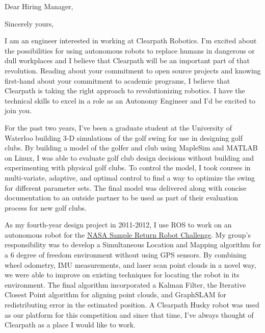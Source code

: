 \documentclass[11pt,a4paper,sans]{moderncv} %
\begin{document}
\clearpage

\date{\today} %
\opening{Dear Hiring Manager,} %
\closing{Sincerely yours,} %

\makelettertitle %

I am an engineer interested in working at Clearpath Robotics. I'm excited about the possibilities for using autonomous robots to replace humans in dangerous or dull workplaces and I believe that Clearpath will be an important part of that revolution. Reading about your commitment to open source projects and knowing first-hand about your commitment to academic programs, I believe that Clearpath is taking the right approach to revolutionizing robotics. I have the technical skills to excel in a role as an Autonomy Engineer and I'd be excited to join you.

For the past two years, I've been a graduate student at the University of Waterloo building 3-D simulations of the golf swing for use in designing golf clubs. By building a model of the golfer and club using MapleSim and MATLAB on Linux, I was able to evaluate golf club design decisions without building and experimenting with physical golf clubs. To control the model, I took courses in multi-variate, adaptive, and optimal control to find a way to optimize the swing for different parameter sets. The final model was delivered along with concise documentation to an outside partner to be used as part of their evaluation process for new golf clubs.

As my fourth-year design project in 2011-2012, I use ROS to work on an autonomous robot for the \href{http://www.nasa.gov/directorates/spacetech/centennial_challenges/sample_return_robot/index.html}{NASA Sample Return Robot Challenge}. My group's responsibility was to develop a Simultaneous Location and Mapping algorithm for a 6 degree of freedom environment without using GPS sensors. By combining wheel odometry, IMU measurements, and laser scan point clouds in a novel way, we were able to improve on existing techniques for locating the robot in its environment. The final algorithm incorporated a Kalman Filter, the Iterative Closest Point algorithm for aligning point clouds, and GraphSLAM for redistributing error in the estimated position. A Clearpath Husky robot was used as our platform for this competition and since that time, I've always thought of Clearpath as a place I would like to work.
\end{document}

